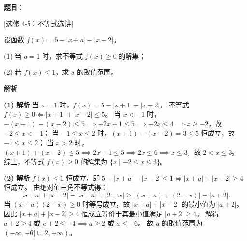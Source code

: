 \begin{answer}

\textbf{题目}：

[选修 4-5：不等式选讲]

设函数 $f(x)=5-|x+a|-|x-2|$。

(1) 当 $a=1$ 时，求不等式 $f(x)\geqslant0$ 的解集；

(2) 若 $f(x)\leqslant1$，求 $a$ 的取值范围。

\textbf{解析}

\textbf{(1) 解析} 当 $a=1$ 时，$f(x) = 5-|x+1|-|x-2|$。
不等式 $f(x)\geqslant 0 \iff |x+1|+|x-2|\leqslant 5$。
当 $x<-1$ 时，$-(x+1)-(x-2)\leqslant 5 \implies -2x+1\leqslant 5 \implies -2x\leqslant 4 \implies x\geqslant -2$，故 $-2\leqslant x<-1$；
当 $-1\leqslant x\leqslant 2$ 时，$(x+1)-(x-2) = 3\leqslant 5$ 恒成立，故 $-1\leqslant x\leqslant 2$；
当 $x>2$ 时，$(x+1)+(x-2)\leqslant 5 \implies 2x-1\leqslant 5 \implies 2x\leqslant 6 \implies x\leqslant 3$，故 $2<x\leqslant 3$。
综上，不等式 $f(x)\geqslant 0$ 的解集为 $\{x\mid -2\leqslant x\leqslant 3\}$。

\textbf{(2) 解析} $f(x)\leqslant 1$ 恒成立，即 $5-|x+a|-|x-2|\leqslant 1 \iff |x+a|+|x-2|\geqslant 4$ 恒成立。
由绝对值三角不等式得：
\nopagebreak[4]
\[|x+a|+|x-2| = |x+a|+|2-x| \geqslant |(x+a)+(2-x)| = |a+2|.\]
当 $(x+a)(2-x)\geqslant 0$ 时等号成立，故 $|x+a|+|x-2|$ 的最小值为 $|a+2|$。
因此 $|x+a|+|x-2|\geqslant 4$ 恒成立等价于其最小值满足 $|a+2|\geqslant 4$。
解得 $a+2\geqslant 4$ 或 $a+2\leqslant -4 \implies a\geqslant 2$ 或 $a\leqslant -6$。
故 $a$ 的取值范围为 $(-\infty,-6]\cup[2,+\infty)$。


\gkanswer{答案（2）：$(-\infty,-6]\cup[2,+\infty)$}

\end{answer}